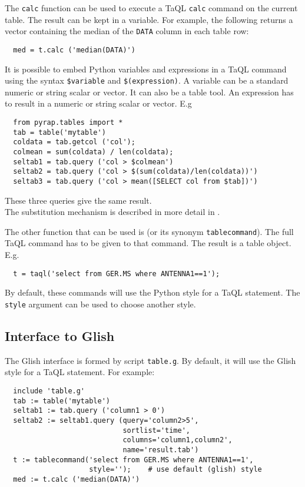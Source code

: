  The \texttt{calc} function can be used to execute a TaQL
  \texttt{calc} command on the current table. The result can be kept
  in a variable. For example, the following returns a vector containing
  the median of the \texttt{DATA} column in each table row:
\begin{verbatim}
  med = t.calc ('median(DATA)')
\end{verbatim}

  It is possible to embed Python variables and expressions in a TaQL
  command using the syntax \texttt{\$variable} and
  \texttt{\$(expression)}. A variable can be a standard numeric or
  string scalar or vector. It can also be a table tool.
  An expression has to result in a numeric or string scalar or vector.
  E.g
\begin{verbatim}
  from pyrap.tables import *
  tab = table('mytable')
  coldata = tab.getcol ('col');
  colmean = sum(coldata) / len(coldata);
  seltab1 = tab.query ('col > $colmean')
  seltab2 = tab.query ('col > $(sum(coldata)/len(coldata))')
  seltab3 = tab.query ('col > mean([SELECT col from $tab])')
\end{verbatim}
  These three queries give the same result.
  \\The substitution mechanism is described in more detail in
  .

  The other function that can be used is
  (or its synonym \texttt{tablecommand}).
  The full TaQL command has to be given to that command. The result is
  a table object. E.g.
\begin{verbatim}
  t = taql('select from GER.MS where ANTENNA1==1');
\end{verbatim}  

  By default, these commands will use the Python style for a TaQL
  statement. The \texttt{style} argument can be used
  to choose another style.

\subsection{Interface to Glish}
  The Glish interface is formed by script \texttt{table.g}.
  By default, it will use the Glish style for a TaQL
  statement.
  For example:
\begin{verbatim}
  include 'table.g'
  tab := table('mytable')
  seltab1 := tab.query ('column1 > 0')
  seltab2 := seltab1.query (query='column2>5',
                            sortlist='time',
                            columns='column1,column2',
                            name='result.tab')
  t := tablecommand('select from GER.MS where ANTENNA1==1',
                    style='');    # use default (glish) style
  med := t.calc ('median(DATA)')
\end{verbatim}

